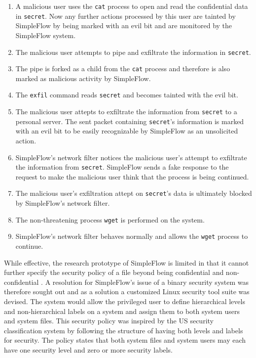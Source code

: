 \begin{enumerate}[label={\protect\circled{\arabic*}}]
    \item A malicious user uses the \texttt{cat} process to open and read the confidential data in \texttt{secret}.
          Now any further actions processed by this user are tainted by SimpleFlow by being marked with an evil bit 
          and are monitored by the SimpleFlow system.
    \item The malicious user attempts to pipe and exfiltrate the information in \texttt{secret}.
    \item The pipe is forked as a child from the \texttt{cat} process and therefore is also marked as malicious activity by SimpleFlow.
    \item The \texttt{exfil} command reads \texttt{secret} and becomes tainted with the evil bit.
    \item The malicious user attepts to exfiltrate the information from \texttt{secret} to a personal server. 
          The sent packet containing \texttt{secret}'s
          information is marked with an evil bit to be easily recognizable by SimpleFlow as an unsolicited action.
    \item SimpleFlow's network filter notices the malicious user's attempt to exfiltrate the information from \texttt{secret}.
          SimpleFlow sends a fake response to the request to make the malicious user think that the process is being continued.
    \item The malicious user's exfiltration attept on \texttt{secret}'s data is ultimately blocked by SimpleFlow's network filter.
    \item The non-threatening process \texttt{wget} is performed on the system.
    \item SimpleFlow's network filter behaves normally and allows the \texttt{wget} process to continue.
\end{enumerate}


While effective, the research prototype of SimpleFlow is limited in 
that it cannot further specify the security policy of a file beyond 
being confidential and non-confidential \cite{ryan2016}. A resolution 
for SimpleFlow’s issue of a binary security system was therefore sought out and as a solution 
a customized Linux security tool suite was devised. The system would allow the 
privileged user to define hierarchical levels and non-hierarchical 
labels on a system and assign them to both system users and system 
files. This security policy was inspired by the US security 
classification system \cite{natsecinfo} by following the structure of having both levels 
and labels for security. The policy states that both system files and system users may each have one 
security level and zero or more security labels. 

